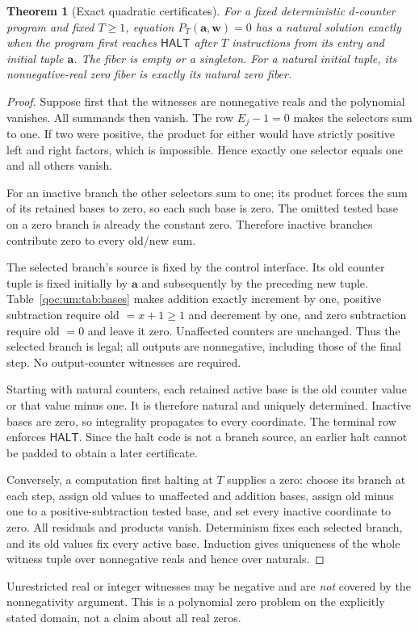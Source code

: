\documentclass[11pt,letterpaper]{article}
\newtheorem{theorem}{Theorem}[section]
\theoremstyle{definition}
\theoremstyle{remark}
\newcommand{\HALT}{\mathsf{HALT}}
\begin{document}
\begin{theorem}[Exact quadratic certificates]\label{qoc:um:thm:poly}
For a fixed deterministic $d$-counter program and fixed $T\geq1$, equation $P_T(\mathbf a,\mathbf w)=0$ has a natural solution exactly when the program first reaches $\HALT$ after $T$ instructions from its entry and initial tuple $\mathbf a$. The fiber is empty or a singleton. For a natural initial tuple, its nonnegative-real zero fiber is exactly its natural zero fiber.
\end{theorem}
\begin{proof}
Suppose first that the witnesses are nonnegative reals and the polynomial vanishes. All summands then vanish. The row $E_j-1=0$ makes the selectors sum to one. If two were positive, the product for either would have strictly positive left and right factors, which is impossible. Hence exactly one selector equals one and all others vanish.

For an inactive branch the other selectors sum to one; its product forces the sum of its retained bases to zero, so each such base is zero. The omitted tested base on a zero branch is already the constant zero. Therefore inactive branches contribute zero to every old/new sum.

The selected branch's source is fixed by the control interface. Its old counter tuple is fixed initially by $\mathbf a$ and subsequently by the preceding new tuple. Table~\ref{qoc:um:tab:bases} makes addition exactly increment by one, positive subtraction require old $=x+1\geq1$ and decrement by one, and zero subtraction require old $=0$ and leave it zero. Unaffected counters are unchanged. Thus the selected branch is legal; all outputs are nonnegative, including those of the final step. No output-counter witnesses are required.

Starting with natural counters, each retained active base is the old counter value or that value minus one. It is therefore natural and uniquely determined. Inactive bases are zero, so integrality propagates to every coordinate. The terminal row enforces $\HALT$. Since the halt code is not a branch source, an earlier halt cannot be padded to obtain a later certificate.

Conversely, a computation first halting at $T$ supplies a zero: choose its branch at each step, assign old values to unaffected and addition bases, assign old minus one to a positive-subtraction tested base, and set every inactive coordinate to zero. All residuals and products vanish. Determinism fixes each selected branch, and its old values fix every active base. Induction gives uniqueness of the whole witness tuple over nonnegative reals and hence over naturals.
\end{proof}
Unrestricted real or integer witnesses may be negative and are \emph{not} covered by the nonnegativity argument. This is a polynomial zero problem on the explicitly stated domain, not a claim about all real zeros.
\end{document}
